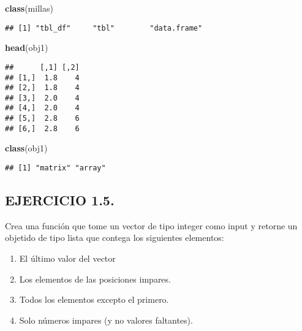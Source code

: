 \documentclass[]{article}
\newenvironment{Shaded}{\begin{snugshade}}{\end{snugshade}}
\newcommand{\KeywordTok}[1]{\textcolor[rgb]{0.13,0.29,0.53}{\textbf{#1}}}
\newcommand{\NormalTok}[1]{#1}
\providecommand{\tightlist}{%
  \setlength{\itemsep}{0pt}\setlength{\parskip}{0pt}}
\begin{document}
\begin{Shaded}
\begin{Highlighting}[]
\KeywordTok{class}\NormalTok{(millas)}
\end{Highlighting}
\end{Shaded}

\begin{verbatim}
## [1] "tbl_df"     "tbl"        "data.frame"
\end{verbatim}

\begin{Shaded}
\begin{Highlighting}[]
\KeywordTok{head}\NormalTok{(obj1)}
\end{Highlighting}
\end{Shaded}

\begin{verbatim}
##      [,1] [,2]
## [1,]  1.8    4
## [2,]  1.8    4
## [3,]  2.0    4
## [4,]  2.0    4
## [5,]  2.8    6
## [6,]  2.8    6
\end{verbatim}

\begin{Shaded}
\begin{Highlighting}[]
\KeywordTok{class}\NormalTok{(obj1)}
\end{Highlighting}
\end{Shaded}

\begin{verbatim}
## [1] "matrix" "array"
\end{verbatim}

\hypertarget{ejercicio-1.5.}{%
\subsection{EJERCICIO 1.5.}\label{ejercicio-1.5.}}

Crea una función que tome un vector de tipo integer como input y retorne
un objetido de tipo lista que contega los siguientes elementos:

\begin{enumerate}
\def\labelenumi{\arabic{enumi}.}
\tightlist
\item
  El último valor del vector
\item
  Los elementos de las posiciones impares.
\item
  Todos los elementos excepto el primero.
\item
  Solo números impares (y no valores faltantes).
\end{enumerate}
\end{document}
